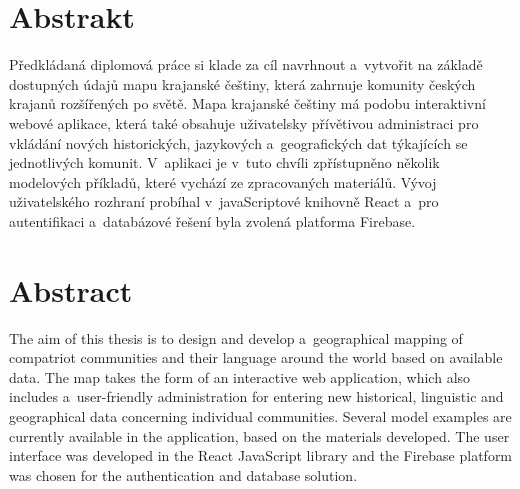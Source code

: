 \chapter*{Abstrakt}

Předkládaná diplomová práce si klade za cíl navrhnout a~vytvořit na základě dostupných údajů mapu krajanské češtiny, která zahrnuje komunity českých krajanů rozšířených po světě. Mapa krajanské češtiny má podobu interaktivní webové aplikace, která také obsahuje uživatelsky přívětivou administraci pro vkládání nových historických, jazykových a~geografických dat týkajících se jednotlivých komunit. V~aplikaci je v~tuto chvíli zpřístupněno několik modelových příkladů, které vychází ze zpracovaných materiálů. Vývoj uživatelského rozhraní probíhal v~javaScriptové knihovně React a~pro autentifikaci a~databázové řešení byla zvolená platforma Firebase.

\chapter*{Abstract}

The aim of this thesis is to design and develop a~geographical mapping of compatriot communities and their language around the world based on available data. The map takes the form of an interactive web application, which also includes a~user-friendly administration for entering new historical, linguistic and geographical data concerning individual communities. Several model examples are currently available in the application, based on the materials developed. The user interface was developed in the React JavaScript library and the Firebase platform was chosen for the authentication and database solution.
